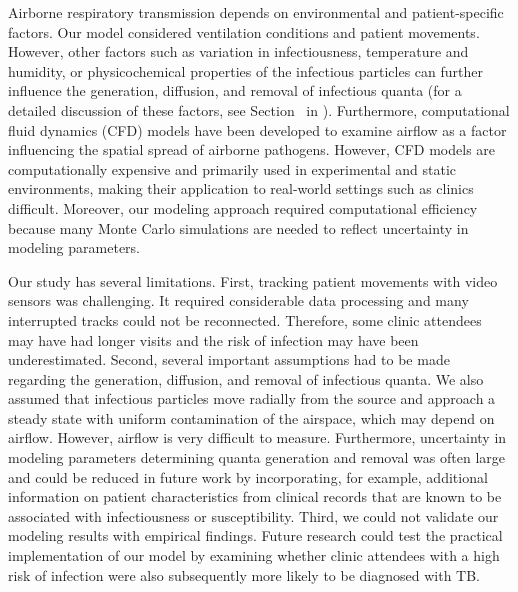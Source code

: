 \documentclass[fleqn,11pt]{wlscirep}
\begin{document}
Airborne respiratory transmission depends on environmental and patient-specific factors. Our model considered ventilation conditions and patient movements. However, other factors such as variation in infectiousness, temperature and humidity, or physicochemical properties of the infectious particles can further influence the generation, diffusion, and removal of infectious quanta (for a detailed discussion of these factors, see Section~ in \supp). Furthermore, computational fluid dynamics (CFD) models have been developed to examine airflow as a factor influencing the spatial spread of airborne pathogens\cite{Vuorinen2020SafSci,Jung2021InfectChemo,Li2021BuildEnv,Yan2023BE,Qian2009BE,Li2022SOTTE}. However, CFD models are computationally expensive and primarily used in experimental and static environments, making their application to real-world settings such as clinics difficult. Moreover, our modeling approach required computational efficiency because many Monte Carlo simulations are needed to reflect uncertainty in modeling parameters. 

Our study has several limitations. First, tracking patient movements with video sensors was challenging. It required considerable data processing and many interrupted tracks could not be reconnected. Therefore, some clinic attendees may have had longer visits and the risk of infection may have been underestimated. Second, several important assumptions had to be made regarding the generation, diffusion, and removal of infectious quanta.  We also assumed that infectious particles move radially from the source and approach a steady state with uniform contamination of the airspace, which may depend on airflow. However, airflow is very difficult to measure. Furthermore, uncertainty in modeling parameters determining quanta generation and removal was often large and could be reduced in future work by incorporating, for example, additional information on patient characteristics from clinical records that are known to be associated with infectiousness\cite{Escombe2008PLoSMed} or susceptibility\cite{Furin2019Lancet}. Third,  we could not validate our modeling results with empirical findings. Future research could test the practical implementation of our model by examining whether clinic attendees with a high risk of infection were also subsequently more likely to be diagnosed with TB.  
\end{document}

